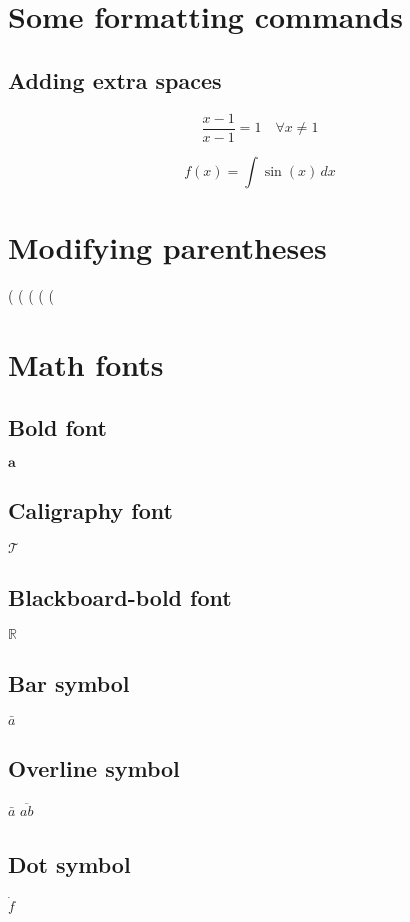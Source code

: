 \documentclass{article}
\theoremstyle{definition}
\theoremstyle{remark}
\begin{document}
\section{Some formatting commands}
  \subsection{Adding extra spaces}
  \[\frac{x-1}{x-1}=1 \quad \forall x\neq1\]

  \[f(x)=\int\sin(x)\,dx\]

\section{Modifying parentheses}
  ( \big( \Big( \bigg( \Bigg(

\section{Math fonts}
  \subsection{Bold font}
  $\mathbf{a}$

  \subsection{Caligraphy font}
  $\mathcal{T}$

  \subsection{Blackboard-bold font}
  $\mathbb{R}$

  \subsection{Bar symbol}
  $\bar{a}$

  \subsection{Overline symbol}
  $\bar{a}$
  $\overline{ab}$

  \subsection{Dot symbol}
  $\dot{f}$
\end{document}
